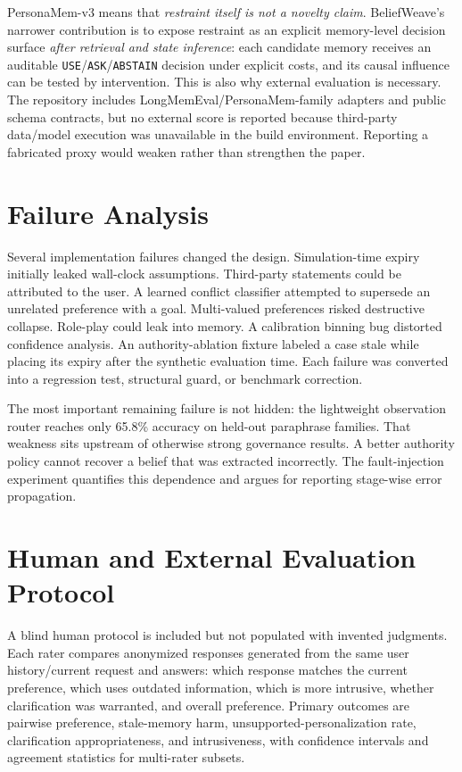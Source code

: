 \documentclass[10pt]{article}
\begin{document}
PersonaMem-v3 means that \emph{restraint itself is not a novelty claim}. BeliefWeave's narrower contribution is to expose restraint as an explicit memory-level decision surface \emph{after retrieval and state inference}: each candidate memory receives an auditable \texttt{USE}/\texttt{ASK}/\texttt{ABSTAIN} decision under explicit costs, and its causal influence can be tested by intervention. This is also why external evaluation is necessary. The repository includes LongMemEval/PersonaMem-family adapters and public schema contracts, but no external score is reported because third-party data/model execution was unavailable in the build environment. Reporting a fabricated proxy would weaken rather than strengthen the paper.

\section{Failure Analysis}
Several implementation failures changed the design. Simulation-time expiry initially leaked wall-clock assumptions. Third-party statements could be attributed to the user. A learned conflict classifier attempted to supersede an unrelated preference with a goal. Multi-valued preferences risked destructive collapse. Role-play could leak into memory. A calibration binning bug distorted confidence analysis. An authority-ablation fixture labeled a case stale while placing its expiry after the synthetic evaluation time. Each failure was converted into a regression test, structural guard, or benchmark correction.

The most important remaining failure is not hidden: the lightweight observation router reaches only 65.8\% accuracy on held-out paraphrase families. That weakness sits upstream of otherwise strong governance results. A better authority policy cannot recover a belief that was extracted incorrectly. The fault-injection experiment quantifies this dependence and argues for reporting stage-wise error propagation.

\section{Human and External Evaluation Protocol}
A blind human protocol is included but not populated with invented judgments. Each rater compares anonymized responses generated from the same user history/current request and answers: which response matches the current preference, which uses outdated information, which is more intrusive, whether clarification was warranted, and overall preference. Primary outcomes are pairwise preference, stale-memory harm, unsupported-personalization rate, clarification appropriateness, and intrusiveness, with confidence intervals and agreement statistics for multi-rater subsets.
\end{document}
